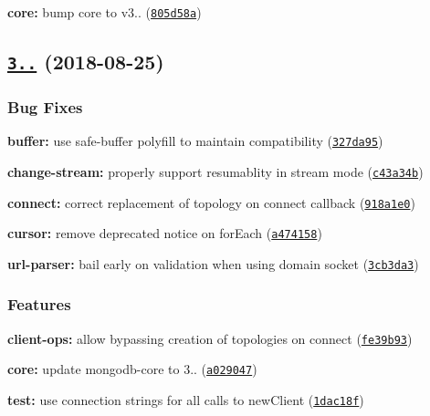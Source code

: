 \begin{DoxyItemize}
\item {\bfseries core\+:} bump core to v3.. (\href{https://github.com/mongodb/node-mongodb-native/commit/805d58a}{\tt 805d58a})
\end{DoxyItemize}

\label{_3.1.4}%
 \subsection*{\href{https://github.com/mongodb/node-mongodb-native/compare/v3.1.3...v3.1.4}{\tt 3..} (2018-\/08-\/25)}

\subsubsection*{Bug Fixes}


\begin{DoxyItemize}
\item {\bfseries buffer\+:} use safe-\/buffer polyfill to maintain compatibility (\href{https://github.com/mongodb/node-mongodb-native/commit/327da95}{\tt 327da95})
\item {\bfseries change-\/stream\+:} properly support resumablity in stream mode (\href{https://github.com/mongodb/node-mongodb-native/commit/c43a34b}{\tt c43a34b})
\item {\bfseries connect\+:} correct replacement of topology on connect callback (\href{https://github.com/mongodb/node-mongodb-native/commit/918a1e0}{\tt 918a1e0})
\item {\bfseries cursor\+:} remove deprecated notice on for\+Each (\href{https://github.com/mongodb/node-mongodb-native/commit/a474158}{\tt a474158})
\item {\bfseries url-\/parser\+:} bail early on validation when using domain socket (\href{https://github.com/mongodb/node-mongodb-native/commit/3cb3da3}{\tt 3cb3da3})
\end{DoxyItemize}

\subsubsection*{Features}


\begin{DoxyItemize}
\item {\bfseries client-\/ops\+:} allow bypassing creation of topologies on connect (\href{https://github.com/mongodb/node-mongodb-native/commit/fe39b93}{\tt fe39b93})
\item {\bfseries core\+:} update mongodb-\/core to 3.. (\href{https://github.com/mongodb/node-mongodb-native/commit/a029047}{\tt a029047})
\item {\bfseries test\+:} use connection strings for all calls to {\ttfamily new\+Client} (\href{https://github.com/mongodb/node-mongodb-native/commit/1dac18f}{\tt 1dac18f})
\end{DoxyItemize}

